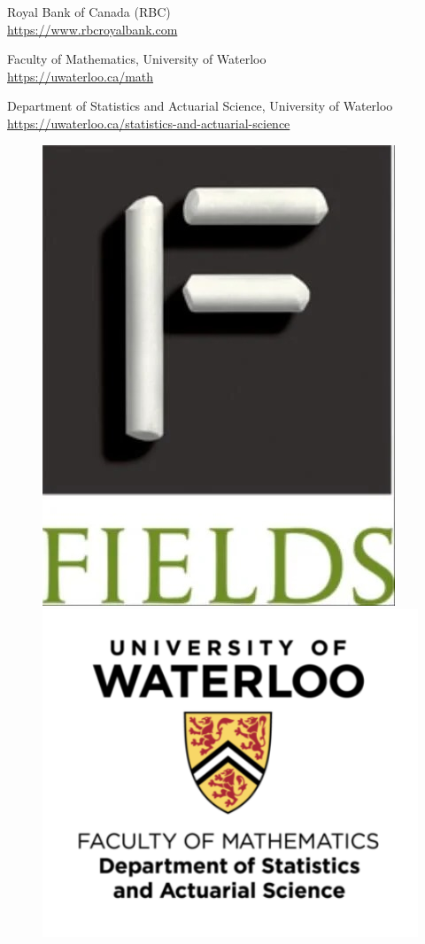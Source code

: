 Royal Bank of Canada (RBC)\\
\url{https://www.rbcroyalbank.com}

Faculty of Mathematics, University of Waterloo\\
\url{https://uwaterloo.ca/math}

Department of Statistics and Actuarial Science, University of Waterloo\\
\url{https://uwaterloo.ca/statistics-and-actuarial-science}\\

\begin{figure}[ht]
\includegraphics[scale =0.2]{Photos/fields_logo_extralarge}
\hfill
\includegraphics[scale =0.5]{Photos/UW.png}

\end{figure}
